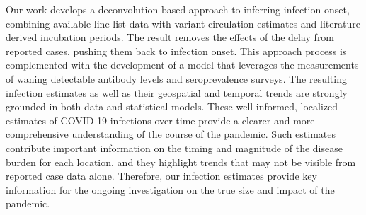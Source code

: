 Our work develops a deconvolution-based approach to inferring infection onset,
combining available line list data with variant circulation estimates and
literature derived incubation periods. The result removes the effects of the
delay from reported cases, pushing them back to infection onset. This approach
process is complemented with the development of a model that leverages the
measurements of waning detectable antibody levels and seroprevalence surveys.
The resulting infection estimates as well as their geospatial and temporal
trends are strongly grounded in both data and statistical models.
%
%
%
These well-informed, localized estimates of COVID-19 infections over time
provide a clearer and more comprehensive understanding of the course of the
pandemic. Such estimates contribute important information on the timing and
magnitude of the disease burden for each location, and they highlight trends
that may not be visible from reported case data alone. Therefore, our infection
estimates provide key information for the ongoing investigation on the true size
and impact of the pandemic.
